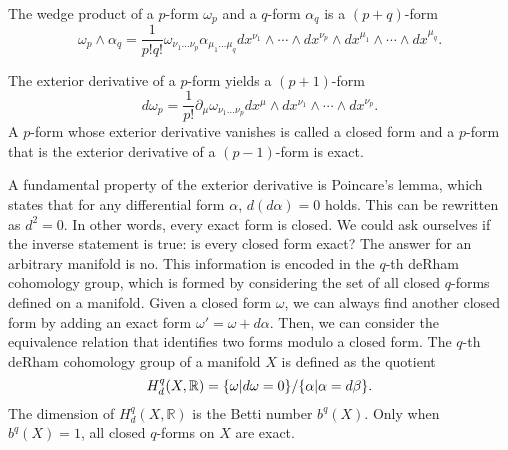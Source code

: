 The wedge product of a $p$-form $\omega_p$ and a $q$-form $\alpha_q$ is a $(p+q)$-form
\begin{equation}
  \omega_p \wedge \alpha_q  = \frac{1}{p!q!}\omega_{\nu_1\ldots\nu_p}
\alpha_{\mu_1\ldots\mu_q}dx^{\nu_1}\wedge \cdots  \wedge dx^{\nu_p}\wedge dx^{\mu_1}\wedge \cdots  \wedge dx^{\mu_q}.
\end{equation}

The exterior derivative of a $p$-form yields a $(p+1)$-form
\begin{equation}
  d\omega_p = \frac{1}{p!}\partial_\mu \omega_{\nu_1\ldots\nu_p}dx^\mu\wedge dx^{\nu_1}\wedge\cdots\wedge dx^{\nu_p}.
\end{equation}
A $p$-form whose exterior derivative vanishes is called a closed form and a $p$-form that is the exterior derivative
of a $(p-1)$-form is exact.

A fundamental property of the exterior derivative is Poincare's lemma, which states that for any differential form $\alpha$, $d(d\alpha)=0$ holds.
This can be rewritten as $d^2=0$. In other words, every exact form is closed.
We could ask ourselves if the inverse statement is true:
is every closed form exact?
The answer for an arbitrary manifold is no. %
This information is encoded in the $q$-th deRham cohomology group, which is formed by considering
the set of all closed $q$-forms defined on a manifold.
Given a closed form $\omega$, we can always find another closed form by adding an exact form
$\omega' = \omega+d\alpha$.
Then, we can consider the equivalence relation that identifies two forms modulo a closed form.
The $q$-th deRham cohomology group of a manifold $X$ is defined as the quotient
\begin{equation}
  H^q_d(X,\mathbb R)=\qty{\omega| d\omega=0}/\qty{\alpha|\alpha=d\beta}.
\end{equation}
The dimension of $H^q_d(X,\mathbb R)$ is the Betti number $b^q(X)$.
Only when $b^q(X)=1$, all closed $q$-forms on $X$ are exact.


